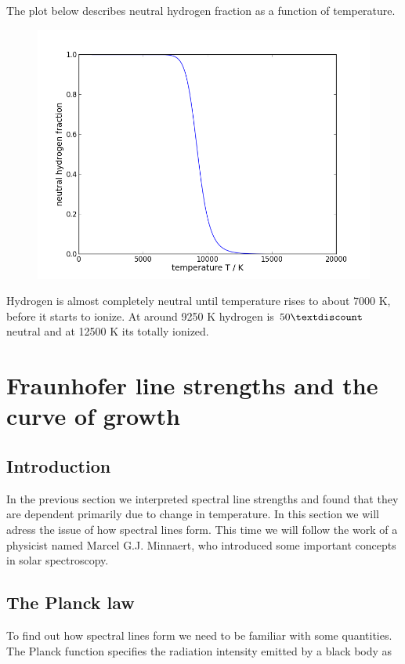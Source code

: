 \documentclass[norsk,a4paper,12pt]{article}
\begin{document}
The plot below describes neutral hydrogen fraction as a function of temperature.

\begin{figure}[H] 
\begin{center} 
\includegraphics[scale=0.5]{ssa28_3.png} 
 

\caption{} 
\end{center} 
\end{figure}


Hydrogen is almost completely neutral until temperature rises to about 7000 K, before it starts to ionize. At around 
9250 K hydrogen is $50\textdiscount $ neutral and at 12500 K its totally ionized.


\section{Fraunhofer line strengths and the curve of growth}

\subsection{Introduction}
In the previous section we interpreted spectral line strengths and found that they are dependent primarily due to 
change in temperature. In this section we will adress the issue of how spectral lines form. This time we will follow 
the work of a physicist named Marcel G.J. Minnaert, who introduced some important concepts in solar spectroscopy.

\subsection{The Planck law}
To find out how spectral lines form we need to be familiar with some quantities.
The Planck function specifies the radiation intensity emitted by a black body as
\end{document}
